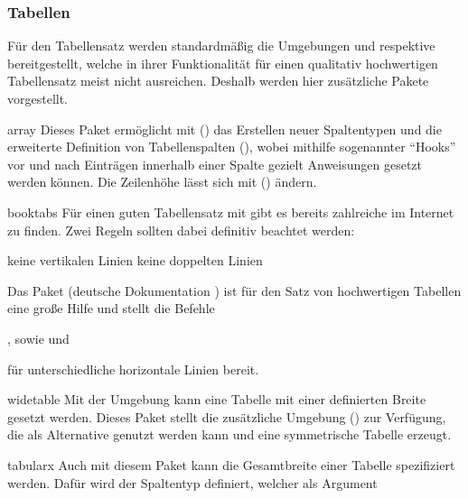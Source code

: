 \subsubsection{Tabellen}
%
%
Für den Tabellensatz werden standardmäßig die Umgebungen  
und  respektive  bereitgestellt, 
welche in ihrer Funktionalität für einen qualitativ hochwertigen Tabellensatz 
meist nicht ausreichen. Deshalb werden hier zusätzliche Pakete vorgestellt. 
%
\begin{packages}
\item[array]
  Dieses Paket ermöglicht mit () das   
  Erstellen neuer Spaltentypen und die erweiterte Definition von Tabellenspalten
  (\PValue{>\PParameter{\dots}}\PValue{<\PParameter{\dots}}), 
  wobei mithilfe sogenannter \enquote{Hooks} vor und nach Einträgen innerhalb 
  einer Spalte gezielt Anweisungen gesetzt werden können. Die Zeilenhöhe lässt 
  sich mit () ändern. 
\item[booktabs]
  Für einen guten Tabellensatz mit  gibt es bereits zahlreiche 
   im 
  Internet zu finden. Zwei Regeln sollten dabei definitiv beachtet werden:
  \begin{enumerate}[itemindent=0pt,labelwidth=*,labelsep=1em,label=\Roman*.]
  \stditem keine vertikalen Linien
  \stditem keine doppelten Linien
  \end{enumerate}
  Das Paket  (deutsche Dokumentation ) 
  ist für den Satz von hochwertigen Tabellen eine große Hilfe und stellt die 
  Befehle 
  \begin{Bundle}{}
  ,  sowie  und 
  \end{Bundle}
  für unterschiedliche horizontale Linien bereit.
\item[widetable]
  Mit der Umgebung  kann eine Tabelle mit einer definierten 
  Breite gesetzt werden. Dieses Paket stellt die zusätzliche Umgebung 
  () zur Verfügung, die als Alternative 
  genutzt werden kann und eine symmetrische Tabelle erzeugt.
\item[tabularx]
  Auch mit diesem Paket kann die Gesamtbreite einer Tabelle spezifiziert 
  werden. Dafür wird der Spaltentyp  definiert, welcher als Argument 

\end{packages}
